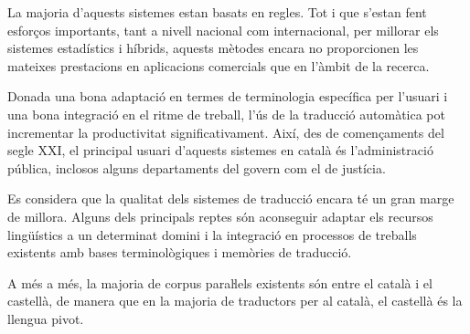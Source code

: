 \begin{multicols}{2}
La majoria d’aquests sistemes estan basats en regles. Tot i que s’estan fent esforços importants, tant a nivell nacional com internacional, per millorar els sistemes estadístics i híbrids, aquests mètodes encara no proporcionen les mateixes prestacions en aplicacions comercials que en l’àmbit de la recerca. 

Donada una bona adaptació en termes de terminologia específica per l’usuari i una bona integració en el ritme de treball, l’ús de la traducció automàtica pot incrementar la productivitat significativament. Així, des de començaments del segle XXI, el principal usuari d’aquests sistemes en català és l’administració pública, inclosos alguns departaments del govern com el de justícia.

Es considera que la qualitat dels sistemes de traducció encara té un gran marge de millora. Alguns dels principals reptes són aconseguir adaptar els recursos lingüístics a un determinat domini i la integració en processos de treballs existents amb bases terminològiques i memòries de traducció.

A més a més, la majoria de corpus paraŀlels existents són entre el català i el castellà, de manera que en la majoria de traductors per al català, el castellà és la llengua pivot.


\end{multicols}

